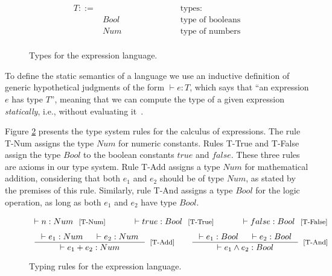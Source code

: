\documentclass[tese,capa,english]{texufpel}
\begin{document}
\begin{figure}[!htb]
\[
\begin{array}{llr}
  T ::= & \ \ \ \ \ \ \ \ \ \ \ \ \ \ \ \ \ \ \ \ \ \ \ \ \ \ \ \ \ \ \ \ \ \ \ \ \ \ & \textrm{types: } \\
        & Bool  & \textrm{type of booleans} \\
        & Num & \textrm{type of numbers} \\
\end{array}
\]
\caption{Types for the expression language.}
\label{fig:syntypes}
\end{figure}

To define the static semantics of a language we use an inductive definition of generic hypothetical judgments of the form $\vdash e : T$, which says that ``an expression $e$ has type $T$'', meaning that we can compute the type of a given expression \emph{statically}, i.e., without evaluating it~\cite{Pierce:2002:TPL:509043}.

Figure \ref{fig:typing} presents the type system rules for the calculus of expressions. The rule {\footnotesize\textrm{T-Num}} assigns the type $Num$ for numeric constants. Rules {\footnotesize\textrm{T-True}} and {\footnotesize\textrm{T-False}} assign the type $Bool$ to the boolean constants $true$ and $false$. These three rules are axioms in our type system. Rule {\footnotesize\textrm{T-Add}} assigns a type $Num$ for mathematical addition, considering that both $e_1$ and $e_2$ should be of type $Num$, as stated by the premises of this rule. Similarly, rule {\footnotesize\textrm{T-And}} assigns a type $Bool$ for the logic operation, as long as both $e_1$ and $e_2$ have type $Bool$. 

\begin{figure}[!htb]
\[
\begin{array}{ccc}    
  \vdash n : Num \ \ \footnotesize\textrm{[T-Num]} \ \ \ \
&
  \ \ \ \ \vdash true : Bool \ \ \footnotesize\textrm{[T-True]} \ \ \ \
&
  \ \ \ \ \vdash false : Bool \ \ \footnotesize\textrm{[T-False]}
\end{array}
\]
\vspace{3pt}
\[
\begin{array}{ccc}    
  \inference{\vdash e_1 : Num \ \ \ \ \vdash e_2 : Num}
            {\vdash e_1 + e_2 : Num}[\textrm{[T-Add]}]
& &
  \inference{\vdash e_1 : Bool \ \ \ \ \vdash e_2 : Bool}
            {\vdash e_1 \wedge e_2 : Bool}[\textrm{[T-And]}]                                
\end{array}
\] 
\caption{Typing rules for the expression language.}
\label{fig:typing}
\end{figure}
\end{document}
